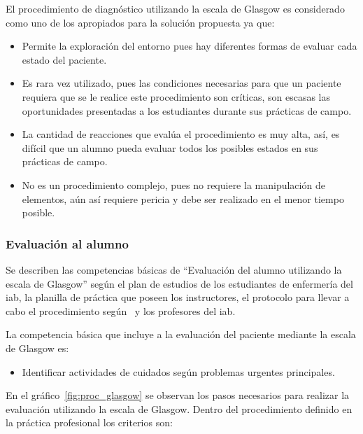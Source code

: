 El procedimiento de diagnóstico utilizando la escala de Glasgow es considerado
como uno de los apropiados para la solución propuesta ya que:

\begin{itemize}
\item Permite la exploración del entorno pues hay diferentes formas de evaluar cada
    estado del paciente.
\item Es rara vez utilizado, pues las condiciones necesarias para que un paciente 
    requiera que se le realice este procedimiento son críticas, son
    escasas las oportunidades presentadas a los estudiantes durante sus
    prácticas de campo. 
\item La cantidad de reacciones que evalúa el procedimiento es muy alta,
    así, es difícil que un alumno pueda evaluar todos los posibles estados en
    sus prácticas de campo.
\item No es un procedimiento complejo, pues no requiere la manipulación de
    elementos, aún así requiere pericia y debe ser realizado en el menor tiempo
    posible.
\end{itemize}


\subsubsection{Evaluación al alumno}

Se describen las competencias básicas de \enquote{Evaluación del alumno utilizando la
escala de Glasgow} según el
plan de estudios de los estudiantes de enfermería del \Gls{iab}, la planilla de práctica 
que poseen los instructores, el protocolo para llevar a cabo el procedimiento según~\cite{protocolo}
y los profesores del \Gls{iab}.

La competencia básica que incluye a la evaluación del paciente mediante la
escala de Glasgow es:

\begin{itemize}
\item Identificar actividades de cuidados según problemas urgentes principales.
\end{itemize}

En el gráfico~\ref{fig:proc_glasgow} se observan los pasos necesarios para
realizar la evaluación utilizando la escala de Glasgow\cite{protocolo}. Dentro del
procedimiento definido en la práctica profesional los criterios son:

